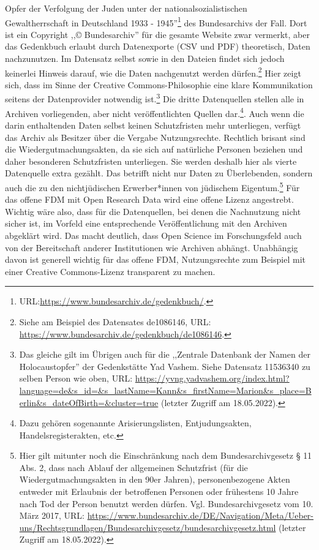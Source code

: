 Opfer der Verfolgung der Juden unter der nationalsozialistischen Gewaltherrschaft in Deutschland 1933 - 1945''\footnote{URL:\url{https://www.bundesarchiv.de/gedenkbuch/}.} des Bundesarchivs der Fall. Dort ist ein Copyright ,,© Bundesarchiv'' für die gesamte Website zwar vermerkt, aber das Gedenkbuch erlaubt durch Datenexporte (CSV und PDF) theoretisch, Daten nachzunutzen. Im Datensatz selbst sowie in den Dateien findet sich jedoch keinerlei Hinweis darauf, wie die Daten nachgenutzt werden dürfen.\footnote{Siehe am Beispiel des Datensates de1086146, URL: \url{https://www.bundesarchiv.de/gedenkbuch/de1086146}.} Hier zeigt sich, dass im Sinne der Creative Commons-Philosophie eine klare Kommunikation seitens der Datenprovider notwendig ist.\footnote{Das gleiche gilt im Übrigen auch für die ,,Zentrale Datenbank der Namen der Holocaustopfer'' der Gedenkstätte Yad Vashem. Siehe Datensatz 11536340 zu selben Person wie oben, URL: \url{https://yvng.yadvashem.org/index.html?language=de&s_id=&s_lastName=Kann&s_firstName=Marion&s_place=Berlin&s_dateOfBirth=&cluster=true} (letzter Zugriff am 18.05.2022).} Die dritte Datenquellen stellen alle in Archiven vorliegenden, aber nicht veröffentlichten Quellen dar.\footnote{Dazu gehören sogenannte Arisierungslisten, Entjudungsakten, Handelsregisterakten, etc.}. Auch wenn die darin enthaltenden Daten selbst keinen Schutzfristen mehr unterliegen, verfügt das Archiv als Besitzer über die Vergabe Nutzungsrechte. Rechtlich brisant sind die Wiedergutmachungsakten, da sie sich auf natürliche Personen beziehen und daher besonderen Schutzfristen unterliegen. Sie werden deshalb hier als vierte Datenquelle extra gezählt. Das betrifft nicht nur Daten zu Überlebenden, sondern auch die zu den nichtjüdischen Erwerber*innen von jüdischem Eigentum.\footnote{Hier gilt mitunter noch die Einschränkung nach dem Bundesarchivgesetz § 11 Abs. 2, dass nach Ablauf der allgemeinen Schutzfrist (für die Wiedergutmachungsakten in den 90er Jahren), personenbezogene Akten entweder mit Erlaubnis der betroffenen Personen oder frühestens 10 Jahre nach Tod der Person benutzt werden dürfen. Vgl. Bundesarchivgesetz vom 10. März 2017, URL: \url{https://www.bundesarchiv.de/DE/Navigation/Meta/Ueber-uns/Rechtsgrundlagen/Bundesarchivgesetz/bundesarchivgesetz.html} (letzter Zugriff am 18.05.2022).} Für das offene FDM mit Open Research Data wird eine offene Lizenz angestrebt. Wichtig wäre also, dass für die Datenquellen, bei denen die Nachnutzung nicht sicher ist, im Vorfeld eine entsprechende Veröffentlichung mit den Archiven abgeklärt wird. Das macht deutlich, dass Open Science im Forschungsfeld auch von der Bereitschaft anderer Institutionen wie Archiven abhängt. Unabhängig davon ist generell wichtig für das offene FDM, Nutzungsrechte zum Beispiel mit einer Creative Commons-Lizenz transparent zu machen.

